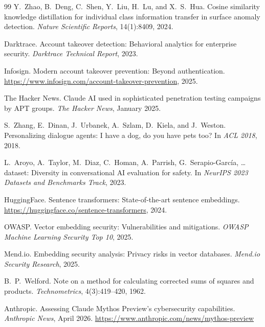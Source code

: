 \documentclass[conference]{IEEEtran}
\begin{document}
\begin{thebibliography}{99}
Y.~Zhao, B.~Deng, C.~Shen, Y.~Liu, H.~Lu, and X.~S.~Hua.
\newblock Cosine similarity knowledge distillation for individual class information
  transfer in surface anomaly detection.
\newblock \emph{Nature Scientific Reports}, 14(1):8409, 2024.

Darktrace.
\newblock Account takeover detection: Behavioral analytics for enterprise security.
\newblock \emph{Darktrace Technical Report}, 2023.

Infosign.
\newblock Modern account takeover prevention: Beyond authentication.
\newblock \url{https://www.infosign.com/account-takeover-prevention}, 2025.

The Hacker News.
\newblock Claude {AI} used in sophisticated penetration testing campaigns by {APT} groups.
\newblock \emph{The Hacker News}, January 2025.

S.~Zhang, E.~Dinan, J.~Urbanek, A.~Szlam, D.~Kiela, and J.~Weston.
\newblock Personalizing dialogue agents: I have a dog, do you have pets too?
\newblock In \emph{ACL 2018}, 2018.

L.~Aroyo, A.~Taylor, M.~Diaz, C.~Homan, A.~Parrish, G.~Serapio-Garc\'{i}a,
  \ldots{}
 dataset: Diversity in conversational {AI} evaluation for safety.
\newblock In \emph{NeurIPS 2023 Datasets and Benchmarks Track}, 2023.

HuggingFace.
\newblock Sentence transformers: State-of-the-art sentence embeddings.
\newblock \url{https://huggingface.co/sentence-transformers}, 2024.

OWASP.
\newblock Vector embedding security: Vulnerabilities and mitigations.
\newblock \emph{OWASP Machine Learning Security Top 10}, 2025.

Mend.io.
\newblock Embedding security analysis: Privacy risks in vector databases.
\newblock \emph{Mend.io Security Research}, 2025.

B.~P.~Welford.
\newblock Note on a method for calculating corrected sums of squares and products.
\newblock \emph{Technometrics}, 4(3):419--420, 1962.


Anthropic.
\newblock Assessing {Claude Mythos Preview}'s cybersecurity capabilities.
\newblock \emph{Anthropic News}, April 2026.
\newblock \url{https://www.anthropic.com/news/mythos-preview}


\end{thebibliography}
\end{document}
